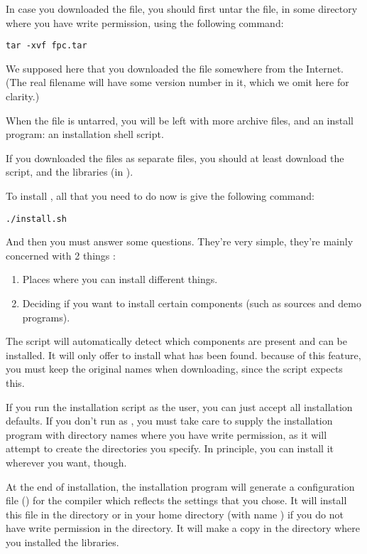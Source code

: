 In case you downloaded the  file, you should first untar
the file, in some directory where
you have write permission, using the following command:
\begin{verbatim}
tar -xvf fpc.tar
\end{verbatim}
We supposed here that you downloaded the file  somewhere
from the Internet. (The real filename will have some version number in it,
which we omit here for clarity.)

When the file is untarred, you will be left with more archive files, and
an install program: an installation shell script.

If you downloaded the files as separate files, you should at least download
the  script, and the libraries (in ).

To install \fpc, all that you need to do now is give the following command:
\begin{verbatim}
./install.sh
\end{verbatim}
And then you must answer some questions. They're very simple, they're
mainly concerned with 2 things :
\begin{enumerate}
\item Places where you can install different things.
\item Deciding if you want to install certain components (such as sources
and demo programs).
\end{enumerate}
The script will automatically detect which components are present and can be
installed. It will only offer to install what has been found.
because of this feature, you must keep the original names when downloading,
since the script expects this.

If you run the installation script as the  user, you can just accept all installation
defaults. If you don't run as , you must take care to supply the
installation program with directory names where you have write permission,
as it will attempt to create the directories you specify.
In principle, you can install it wherever you want, though.

At the end of installation, the installation program will generate a
configuration file () for the \fpc compiler which 
reflects the settings that you chose. It will install this file in 
the  directory or in your home directory (with name
) if you do not have write permission in the 
directory. It will make a copy in the directory where you installed the 
libraries.

